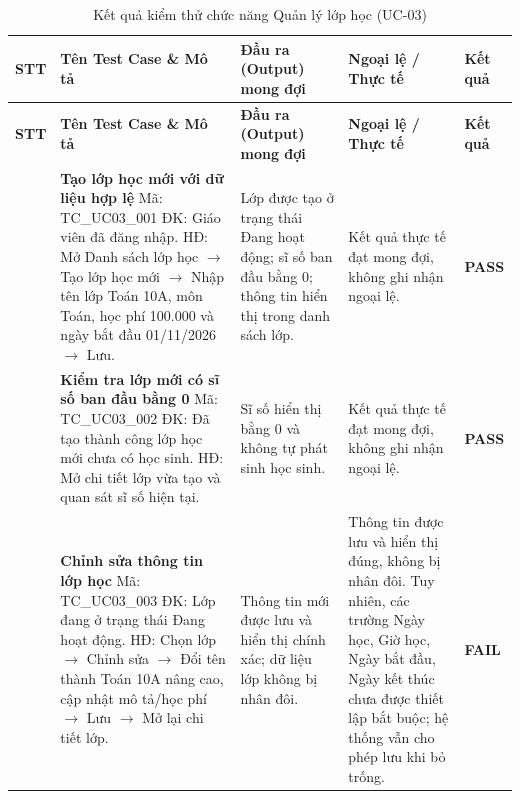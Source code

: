 \vspace{0.4em}
\begin{longtable}{|>{\centering\arraybackslash}p{0.8cm}|>{\raggedright\arraybackslash}p{4.6cm}|>{\raggedright\arraybackslash}p{3.8cm}|>{\raggedright\arraybackslash}p{3.8cm}|>{\centering\arraybackslash}p{1.5cm}|}
\caption{Kết quả kiểm thử chức năng Quản lý lớp học (UC-03)}\label{tab:test-uc03}\\
\hline
\textbf{STT} & \textbf{Tên Test Case \& Mô tả} & \textbf{Đầu ra (Output) mong đợi} & \textbf{Ngoại lệ / Thực tế} & \textbf{Kết quả} \\
\hline
\endfirsthead
\hline
\textbf{STT} & \textbf{Tên Test Case \& Mô tả} & \textbf{Đầu ra (Output) mong đợi} & \textbf{Ngoại lệ / Thực tế} & \textbf{Kết quả} \\
\hline
\endhead
1 & \textbf{Tạo lớp học mới với dữ liệu hợp lệ}\newline
Mã: TC\_UC03\_001\newline
ĐK: Giáo viên đã đăng nhập.\newline
HĐ: Mở Danh sách lớp học $\rightarrow$ Tạo lớp học mới $\rightarrow$ Nhập tên lớp Toán 10A, môn Toán, học phí 100.000 và ngày bắt đầu 01/11/2026 $\rightarrow$ Lưu. &
Lớp được tạo ở trạng thái Đang hoạt động; sĩ số ban đầu bằng 0; thông tin hiển thị trong danh sách lớp. &
Kết quả thực tế đạt mong đợi, không ghi nhận ngoại lệ. & \textbf{PASS} \\
\hline
2 & \textbf{Kiểm tra lớp mới có sĩ số ban đầu bằng 0}\newline
Mã: TC\_UC03\_002\newline
ĐK: Đã tạo thành công lớp học mới chưa có học sinh.\newline
HĐ: Mở chi tiết lớp vừa tạo và quan sát sĩ số hiện tại. &
Sĩ số hiển thị bằng 0 và không tự phát sinh học sinh. &
Kết quả thực tế đạt mong đợi, không ghi nhận ngoại lệ. & \textbf{PASS} \\
\hline
3 & \textbf{Chỉnh sửa thông tin lớp học}\newline
Mã: TC\_UC03\_003\newline
ĐK: Lớp đang ở trạng thái Đang hoạt động.\newline
HĐ: Chọn lớp $\rightarrow$ Chỉnh sửa $\rightarrow$ Đổi tên thành Toán 10A nâng cao, cập nhật mô tả/học phí $\rightarrow$ Lưu $\rightarrow$ Mở lại chi tiết lớp. &
Thông tin mới được lưu và hiển thị chính xác; dữ liệu lớp không bị nhân đôi. &
Thông tin được lưu và hiển thị đúng, không bị nhân đôi. Tuy nhiên, các trường Ngày học, Giờ học, Ngày bắt đầu, Ngày kết thúc chưa được thiết lập bắt buộc; hệ thống vẫn cho phép lưu khi bỏ trống. & \textbf{FAIL} \\

\end{longtable}
